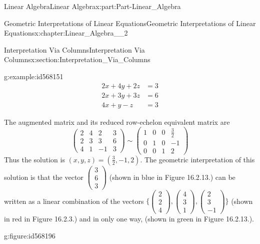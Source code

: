 \documentclass[oneside,10pt,]{book}
\numberwithin{equation}{section}
\newcommand{\amp}{&}
\begin{document}
\begin{partptx}{Linear Algebra}{}{Linear Algebra}{}{}{x:part:Part-Linear_Algebra}
\begin{chapterptx}{Geometric Interpretations of Linear Equations}{}{Geometric Interpretations of Linear Equations}{}{}{x:chapter:Linear_Algebra__2}
\begin{sectionptx}{Interpretation Via Columns}{}{Interpretation Via Columns}{}{}{x:section:Interpretation_Via_Columns}
\begin{example}{}{g:example:id568151}
\begin{align*}
2x+4y+2z \amp=3\\
2x+3y+3z \amp=6\\
4x+y-z \amp=3
\end{align*}
%
\par\smallskip%
\noindent\hypertarget{g:solution:id568168}{}The augmented matrix and its reduced row-echelon equivalent matrix are%
\begin{equation*}
\begin{pmatrix} 2 \amp 4 \amp 2 \amp 3 \\ 2 \amp 3 \amp 3 \amp 6 \\4 \amp 1 \amp -1 \amp 3 \end{pmatrix} \sim \begin{pmatrix} 1 \amp 0 \amp 0 \amp \frac{3}{2} \\ 0 \amp 1 \amp 0 \amp -1 \\ 0 \amp 0 \amp 1 \amp 2 \end{pmatrix}
\end{equation*}
Thus the solution is \((x,y,z)=\left(\frac{3}{2},-1,2 \right)\). The geometric interpretation of this solution is that the vector \(\begin{pmatrix} 3 \\ 6 \\ 3 \end{pmatrix}\) (shown in blue in Figure 16.2.13.) can be written as a linear combination of the vectors \(\Bigg\{\begin{pmatrix} 2 \\ 2 \\ 4 \end{pmatrix}, \begin{pmatrix} 4 \\ 3 \\ 1 \end{pmatrix}, \begin{pmatrix} 2 \\ 3 \\ -1 \end{pmatrix} \Bigg\}\) (shown in red in Figure 16.2.3.) and in only one way, (shown in green in Figure 16.2.13.). \begin{figureptx}{}{g:figure:id568196}{}%
\begin{image}{0.2}{0.6}{0.2}%

\end{image}
\end{figureptx}
\end{example}
\end{sectionptx}
\end{chapterptx}
\end{partptx}
\end{document}
